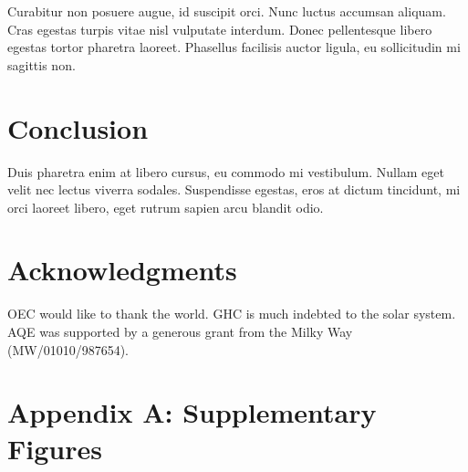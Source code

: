 \documentclass[11pt]{article}
\begin{document}
Curabitur non posuere augue, id suscipit orci. Nunc luctus accumsan aliquam. Cras egestas turpis vitae nisl vulputate interdum. Donec pellentesque libero egestas tortor pharetra laoreet. Phasellus facilisis auctor ligula, eu sollicitudin mi sagittis non.

\section*{Conclusion}

Duis pharetra enim at libero cursus, eu commodo mi vestibulum. Nullam eget velit nec lectus viverra sodales. Suspendisse egestas, eros at dictum tincidunt, mi orci laoreet libero, eget rutrum sapien arcu blandit odio.


\section*{Acknowledgments}

OEC would like to thank the world. GHC is much indebted to the solar system. AQE was supported by a generous grant from the Milky Way (MW/01010/987654).

\newpage{}

\section*{Appendix A: Supplementary Figures}



\end{document}
